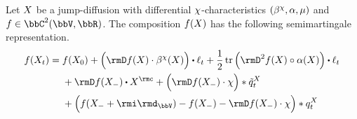 \begin{lemma}
  \label{lemma:ito}
  Let $X$ be a jump-diffusion with differential $\chi$-characteristics $(\beta^\chi, \alpha, \mu)$ and $f \in \ccpathSpace{2}{\vecSpace}{\bbR}$.
  The composition $f(X)$ has the following semimartingale representation.
  \begin{equation*}
    f(\X_t)
    = \begin{aligned}[t]
      &f(\X_0) 
      + \Big( \Der f(\X) \cdot \affDrift^\trunc(\X) \Big) \shortInt \leb_t 
      + \frac12 \tr\Big( \Hess f(\X) \circ \affDiff(\X) \Big)  \shortInt \leb_t \\
      &+ \Der f(\X_-) \shortInt \X^\rmc 
      + \Big( \Der f(\X_-) \cdot \trunc \Big) \ast \compensate{\jumpMeas^\X}_t \\
      &+ \Big( f(\X_-+\id_\vecSpace) - f(\X_-) - \Der f(\X_-) \cdot \trunc \Big) \ast \jumpMeas^\X_t
    \end{aligned}
  \end{equation*}
\end{lemma}
